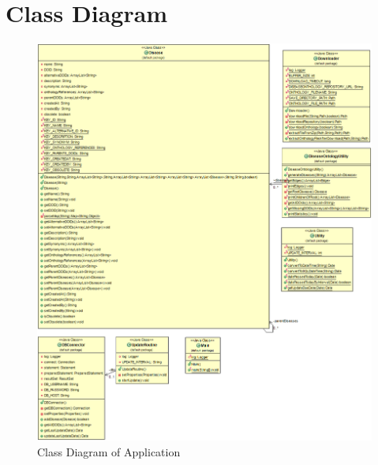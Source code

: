 \chapter{Class Diagram}
\label{Anhang_Klassendiagramm}
\vspace*{\fill}
\begin{figure}[H]
\centering
\includegraphics[scale=0.4]{bilder/UpdateDatabaseClassDiagram.png}
\caption{Class Diagram of Application}
\end{figure}
\vspace*{\fill}

